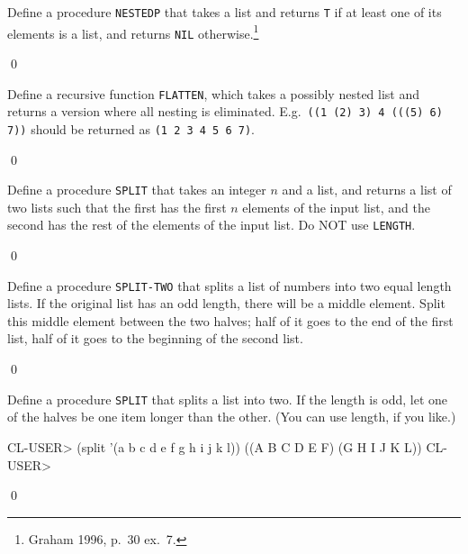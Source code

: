 \documentclass[a4paper,11pt]{article}
\begin{document}
\begin{uexercise}
Define a procedure \Verb+NESTEDP+ that takes a list and returns \Verb+T+ if at least one of its elements is a list, and returns \Verb+NIL+ otherwise.\footnote{Graham 1996, p.\ 30 ex.\ 7.}

\qed
\end{uexercise}

\begin{uexercise}

Define a recursive function \Verb+FLATTEN+, which takes a possibly nested list and returns a version where all nesting is eliminated. E.g.\ \Verb+((1 (2) 3) 4 (((5) 6) 7))+ should be returned as \Verb+(1 2 3 4 5 6 7)+. 

\qed
\end{uexercise}

\begin{uexercise}
Define a procedure \Verb+SPLIT+ that takes an integer $n$ and a list, and returns a list of two lists such that the first has the first $n$ elements of the input list, and the second has the rest of the elements of the input list. Do NOT use \Verb+LENGTH+.

\qed
\end{uexercise}

\begin{uexercise}
Define a procedure \Verb+SPLIT-TWO+ that splits a list of numbers into two equal length lists. If the original list has an odd length, there will be a middle element. Split this middle element between the two halves; half of it goes to the end of the first list, half of it goes to the beginning of the second list.

\qed
\end{uexercise}

\begin{uexercise}
\label{halve}

Define a procedure \Verb+SPLIT+ that splits a list into two. If the
length is odd, let one of the halves be one item longer than the
other. (You can use length, if you like.)

\begin{lispcode}
CL-USER> (split '(a b c d e f g h i j k l))
((A B C D E F) (G H I J K L))
CL-USER>
\end{lispcode}

\qed
\end{uexercise}
\end{document}

